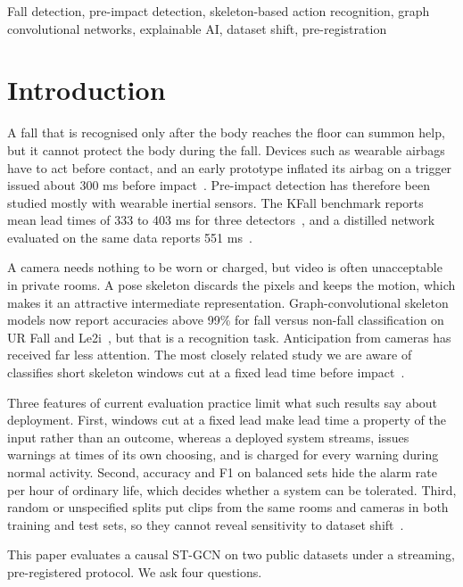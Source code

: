 \documentclass[journal]{IEEEtran}
\begin{document}
\begin{IEEEkeywords}
Fall detection, pre-impact detection, skeleton-based action recognition, graph convolutional networks, explainable AI, dataset shift, pre-registration
\end{IEEEkeywords}
\IEEEpeerreviewmaketitle


\section{Introduction}\label{sec:intro}

A fall that is recognised only after the body reaches the floor can summon help, but it cannot protect the body during the fall. Devices such as wearable airbags have to act before contact, and an early prototype inflated its airbag on a trigger issued about 300 ms before impact~\cite{tamura}. Pre-impact detection has therefore been studied mostly with wearable inertial sensors. The KFall benchmark reports mean lead times of 333 to 403 ms for three detectors~\cite{kfall}, and a distilled network evaluated on the same data reports 551 ms~\cite{prefallkd}.


A camera needs nothing to be worn or charged, but video is often unacceptable in private rooms. A pose skeleton discards the pixels and keeps the motion, which makes it an attractive intermediate representation. Graph-convolutional skeleton models now report accuracies above 99\% for fall versus non-fall classification on UR Fall and Le2i~\cite{shin}, but that is a recognition task. Anticipation from cameras has received far less attention. The most closely related study we are aware of classifies short skeleton windows cut at a fixed lead time before impact~\cite{jesudhas}.


Three features of current evaluation practice limit what such results say about deployment. First, windows cut at a fixed lead make lead time a property of the input rather than an outcome, whereas a deployed system streams, issues warnings at times of its own choosing, and is charged for every warning during normal activity. Second, accuracy and F1 on balanced sets hide the alarm rate per hour of ordinary life, which decides whether a system can be tolerated. Third, random or unspecified splits put clips from the same rooms and cameras in both training and test sets, so they cannot reveal sensitivity to dataset shift~\cite{torralba}.


This paper evaluates a causal ST-GCN on two public datasets under a streaming, pre-registered protocol. We ask four questions.
\end{document}
